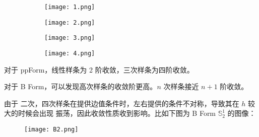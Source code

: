 \documentclass[lang=cn,a4paper,newtx,bibend=bibtex]{elegantpaper}
\newcommand{\SBB}{\mathbb{S}}
\begin{document}
\begin{figure}[H]
  \centering
  \begin{subfigure}[b]{0.45\textwidth}
      \texttt{[image: 1.png]}
  \end{subfigure}
  \hfill
  \begin{subfigure}[b]{0.45\textwidth}
    \texttt{[image: 2.png]}
\end{subfigure}
  
  \medskip
  
  \begin{subfigure}[b]{0.45\textwidth}
    \texttt{[image: 3.png]}
\end{subfigure}
  \hfill
  \begin{subfigure}[b]{0.45\textwidth}
    \texttt{[image: 4.png]}
\end{subfigure}
\end{figure}


对于 ppForm，线性样条为 2 阶收敛，三次样条为四阶收敛。

对于 B Form，可以发现高次样条的收敛阶更高。$n$ 次样条接近 $n+1$ 阶收敛。

由于 二次，四次样条在提供边值条件时，左右提供的条件不对称，导致其在 $h$ 较大的时候会出现
振荡，因此收敛性质收到影响。比如下图为 B Form $\SBB_2^1$ 的图像：

\begin{figure}[H]
  \centering
  \texttt{[image: B2.png]}
\end{figure}


\nocite{*}
\printbibliography[heading=bibintoc, title=\ebibname]

\end{document}
